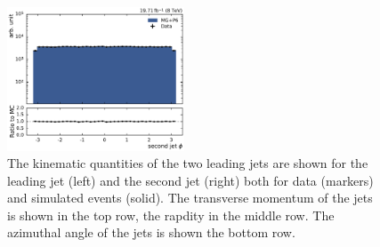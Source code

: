 \begin{figure}[htbp]
    \includegraphics[width=0.47\textwidth]{figures/measurement/jet_quantities_jet2phi.pdf}
    \caption[Kinematic quantities of the jets]{The 
        kinematic quantities of the two leading jets are shown for the leading
        jet (left) and the second jet (right) both for data (markers) and
        simulated events (solid). The transverse momentum of the
        jets is shown in the top row, the rapdity in the middle row. The
        azimuthal angle of the jets is shown the bottom row.}
    \label{fig:controlplots:kinematic}
\end{figure}

